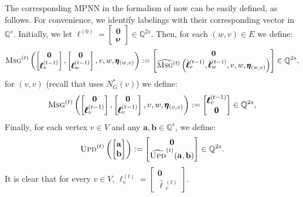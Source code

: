 \documentclass[10pt,a4paper]{article}
\theoremstyle{definition}
\begin{document}
The corresponding MPNN in the formalism of \citet{Loukas2019} now can be easily defined, as follows. For convenience, we identify labelings with their corresponding vector in $\mathbb{Q}^s$.
Initially, we let $\pmb{\ell}^{(0)}=\left[\begin{smallmatrix}
	\mathbf{0} \\
     \pmb{\nu}\end{smallmatrix}\right]\in\mathbb{Q}^{2s}$. Then,
for each $(w,v)\in E$ we define:
$$
\textsc{Msg}^{(t)}\left(\begin{bmatrix}
	\mathbf{0} \\
	\pmb{\ell}^{(t-1)}_v
\end{bmatrix},\begin{bmatrix}
	\mathbf{0} \\
	\pmb{\ell}^{(t-1)}_w
\end{bmatrix},v,w,\pmb{\eta}_{(w,v)}\right):=
\begin{bmatrix}
	\mathbf{0}\\
\widehat{\textsc{Msg}}{}^{(t)}\left(\hat{\pmb{\ell}}{}^{(t-1)}_v,\hat{\pmb{\ell}}{}^{(t-1)}_w,v,w,\pmb{\eta}_{(w,v)}\right)
\end{bmatrix}\in\mathbb{Q}^{2s},
$$
for $(v,v)$ (recall that  \citet{Loukas2019} uses $N_G^*(v)$)  we define:
$$
\textsc{Msg}^{(t)}\left(\begin{bmatrix}
	\mathbf{0} \\
	\pmb{\ell}^{(t-1)}_v
\end{bmatrix},\begin{bmatrix}
	\mathbf{0} \\
	\pmb{\ell}^{(t-1)}_v
\end{bmatrix},v,w,\pmb{\eta}_{(v,v)}\right):=
\begin{bmatrix}
	\pmb{\ell}^{(t-1)}_v \\
	\pmb{0}
\end{bmatrix}\in\mathbb{Q}^{2s},
$$
Finally, for each vertex $v\in V$ and any $\mathbf{a},\mathbf{b}\in\mathbb{Q}^{s}$, we define:
$$\textsc{Upd}^{(t)}\left(\begin{bmatrix}\mathbf{a}\\
\mathbf{b}\end{bmatrix}\right):=\begin{bmatrix} \mathbf{0}\\
\widehat{\textsc{Upd}}^{(t)}(\mathbf{a},\mathbf{b})\end{bmatrix}\in\mathbb{Q}^{2s}.
$$
It is clear that for every $v\in V$, $\pmb{\ell}^{(t)}_v=\left[\begin{smallmatrix}\mathbf{0}\\
\hat{\pmb{\ell}}{}^{(t)}_v\end{smallmatrix}\right]$.
\end{document}

